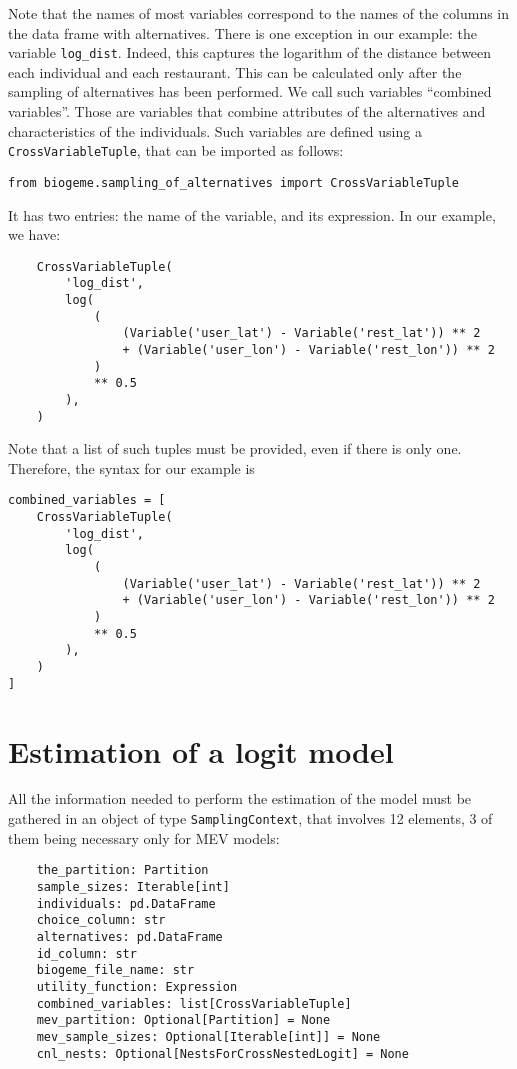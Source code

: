 \documentclass[12pt,a4paper]{article}
\begin{document}
  Note that the names of most variables correspond to the names of the
  columns in the data frame with alternatives. There is one exception in our example:
  the variable \lstinline+log_dist+. Indeed, this captures the
  logarithm of the distance between each individual and each
  restaurant. This can be calculated only after the sampling of
  alternatives has been performed. We call such variables ``combined variables''.
  Those are variables that combine attributes of the alternatives and characteristics of the individuals. Such variables are defined using a \lstinline+CrossVariableTuple+, that can be imported as follows:
  \begin{lstlisting}
from biogeme.sampling_of_alternatives import CrossVariableTuple
  \end{lstlisting}
  It has two entries: the name of the variable, and its expression. In our example, we have:
  \begin{lstlisting}
    CrossVariableTuple(
        'log_dist',
        log(
            (
                (Variable('user_lat') - Variable('rest_lat')) ** 2
                + (Variable('user_lon') - Variable('rest_lon')) ** 2
            )
            ** 0.5
        ),
    )
  \end{lstlisting}
  Note that a list of such tuples must be provided, even if there is only one. Therefore, the syntax for our example is
  \begin{lstlisting}
combined_variables = [
    CrossVariableTuple(
        'log_dist',
        log(
            (
                (Variable('user_lat') - Variable('rest_lat')) ** 2
                + (Variable('user_lon') - Variable('rest_lon')) ** 2
            )
            ** 0.5
        ),
    )
]
  \end{lstlisting}
  
\section{Estimation of a logit model}

All the information needed to perform the estimation of the model must be gathered in an object of type \lstinline+SamplingContext+, that involves 12 elements, 3 of them being necessary only for MEV models:
\begin{lstlisting}
    the_partition: Partition
    sample_sizes: Iterable[int]
    individuals: pd.DataFrame
    choice_column: str
    alternatives: pd.DataFrame
    id_column: str
    biogeme_file_name: str
    utility_function: Expression
    combined_variables: list[CrossVariableTuple]
    mev_partition: Optional[Partition] = None
    mev_sample_sizes: Optional[Iterable[int]] = None
    cnl_nests: Optional[NestsForCrossNestedLogit] = None
\end{lstlisting}
\end{document}
